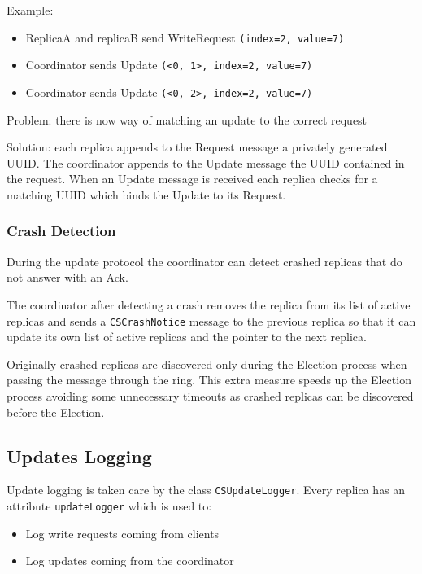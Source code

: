 \documentclass[a4paper]{article}
\begin{document}
            Example:
            \begin{itemize}
                \item ReplicaA and replicaB send WriteRequest \texttt{(index=2, value=7)}
                \item Coordinator sends Update \texttt{(<0, 1>, index=2, value=7)}
                \item Coordinator sends Update \texttt{(<0, 2>, index=2, value=7)}
            \end{itemize}
            Problem: there is now way of matching an update to the correct request

            Solution:
            each replica appends to the Request message a privately generated UUID. The coordinator appends to the Update message the UUID contained in the request. When an Update message is received each replica checks for a matching UUID which binds the Update to its Request.
            \subsubsection{Crash Detection}
                During the update protocol the coordinator can detect crashed replicas that do not answer with an Ack.
                
                The coordinator after detecting a crash removes the replica from its list of active replicas and sends a \texttt{CSCrashNotice} message to the previous replica so that it can update its own list of active replicas and the pointer to the next replica.

                Originally crashed replicas are discovered only during the Election process when passing the message through the ring.
                This extra measure speeds up the Election process avoiding some unnecessary timeouts as crashed replicas can be discovered before the Election.
            \subsection{Updates Logging}
                Update logging is taken care by the class \texttt{CSUpdateLogger}. Every replica has an attribute \texttt{updateLogger} which is used to:
                \begin{itemize}
                    \item Log write requests coming from clients
                    \item Log updates coming from the coordinator
                \end{itemize}
\end{document}
